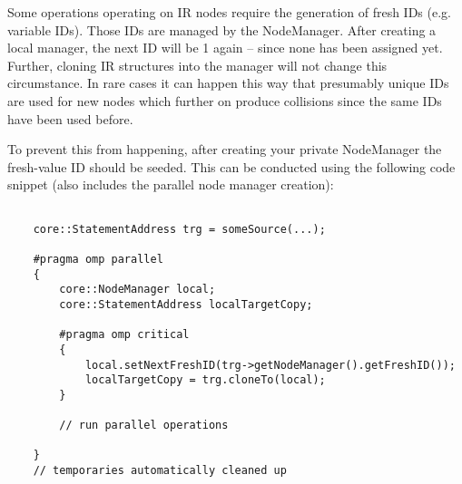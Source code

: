 Some operations operating on IR nodes require the generation of fresh IDs (e.g.
variable IDs). Those IDs are managed by the NodeManager. After creating a local
manager, the next ID will be 1 again -- since none has been assigned yet.
Further, cloning IR structures into the manager will not change this
circumstance. In rare cases it can happen this way that presumably unique IDs
are used for new nodes which further on produce collisions since the same IDs
have been used before.

To prevent this from happening, after creating your private NodeManager the
fresh-value ID should be seeded. This can be conducted using the following code
snippet (also includes the parallel node manager creation):
\begin{lstlisting}

	core::StatementAddress trg = someSource(...);
	
	#pragma omp parallel
	{
		core::NodeManager local;
		core::StatementAddress localTargetCopy;

		#pragma omp critical
		{
			local.setNextFreshID(trg->getNodeManager().getFreshID());
			localTargetCopy = trg.cloneTo(local);
		}
	
		// run parallel operations

	}
	// temporaries automatically cleaned up
\end{lstlisting}


